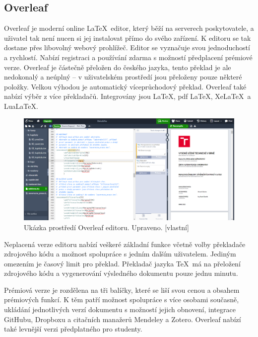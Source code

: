 \subsection{Overleaf}
Overleaf je moderní online \LaTeX\ editor, který běží na serverech poskytovatele, a uživatel tak není nucen si jej instalovat přímo do svého zařízení. K editoru se tak dostane přes libovolný webový prohlížeč. Editor se vyznačuje svou jednoduchostí a rychlostí. Nabízí registraci a používání zdarma s možností předplacení prémiové verze. Overleaf je částečně přeložen do českého jazyka, tento překlad je ale nedokonalý a neúplný -- v uživatelském prostředí jsou přeloženy pouze některé položky. Velkou výhodou je automatický víceprůchodový překlad. Overleaf také nabízí výběr z více překladačů. Integrovány jsou \LaTeX, pdf \LaTeX, Xe\LaTeX\ a Lua\LaTeX. \cite{Overleaf}

\begin{figure}[h]
	\centering
	\includegraphics[width=\textwidth]{obrazky/overleaf.png}
	\caption[Ukázka prostředí Overleaf editoru.]{Ukázka prostředí Overleaf editoru. Upraveno. [vlastní]}
	\label{fig:overleaf}
\end{figure}

Neplacená verze editoru nabízí veškeré základní funkce včetně volby překladače zdrojového kódu a možnost spolupráce s jedním dalším uživatelem. Jediným omezením je časový limit pro překlad. Překladač jazyka \TeX\ má na přeložení zdrojového kódu a vygenerování výsledného dokumentu pouze jednu minutu. \cite{Overleafpremium}

Prémiová verze je rozdělena na tři balíčky, které se liší svou cenou a obsahem prémiových funkcí. K těm patří možnost spolupráce s více osobami současně, ukládání jednotlivých verzí dokumentu s možností jejich obnovení, integrace GitHubu, Dropboxu a citačních manažerů Mendeley a Zotero. Overleaf nabízí také levnější verzi předplatného pro studenty. \cite{Overleafpremiumtab}

